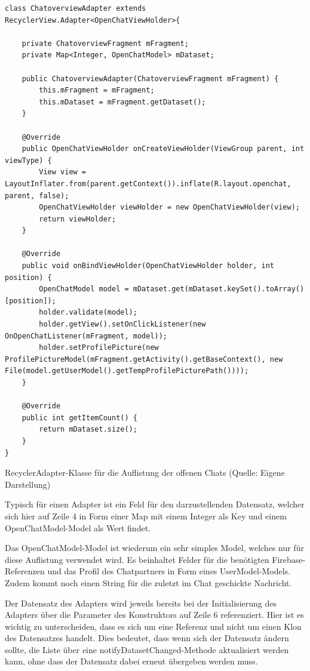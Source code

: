 \documentclass[../main.tex]{subfiles}
\begin{document}
\begin{code}
	\begin{center}
		\begin{verbatim}
class ChatoverviewAdapter extends RecyclerView.Adapter<OpenChatViewHolder>{

	private ChatoverviewFragment mFragment;
	private Map<Integer, OpenChatModel> mDataset;

	public ChatoverviewAdapter(ChatoverviewFragment mFragment) {
		this.mFragment = mFragment;
		this.mDataset = mFragment.getDataset();
	}

	@Override
	public OpenChatViewHolder onCreateViewHolder(ViewGroup parent, int viewType) {
		View view = LayoutInflater.from(parent.getContext()).inflate(R.layout.openchat, parent, false);
		OpenChatViewHolder viewHolder = new OpenChatViewHolder(view);
		return viewHolder;
	}

	@Override
	public void onBindViewHolder(OpenChatViewHolder holder, int position) {
		OpenChatModel model = mDataset.get(mDataset.keySet().toArray()[position]);
		holder.validate(model);
		holder.getView().setOnClickListener(new OnOpenChatListener(mFragment, model));
		holder.setProfilePicture(new ProfilePictureModel(mFragment.getActivity().getBaseContext(), new File(model.getUserModel().getTempProfilePicturePath())));
	}

	@Override
	public int getItemCount() {
		return mDataset.size();
	}
}
		\end{verbatim}
		\caption{RecyclerAdapter-Klasse für die Auflistung der offenen Chats (Quelle: Eigene Darstellung)}
		\label{chatOverviewAdapter}
	\end{center}
\end{code}

	Typisch für einen Adapter ist ein Feld für den darzustellenden Datensatz, welcher sich hier auf Zeile 4 in Form einer Map mit einem Integer als Key und einem OpenChatModel-Model als Wert findet. 
	
	Das OpenChatModel-Model ist wiederum ein sehr simples Model, welches nur für diese Auflistung verwendet wird. Es beinhaltet Felder für die benötigten Firebase-Referenzen und das Profil des Chatpartners in Form eines UserModel-Models. Zudem kommt noch einen String für die zuletzt im Chat geschickte Nachricht.
	
	Der Datensatz des Adapters wird jeweils bereits bei der Initialisierung des Adapters über die Parameter des Konstruktors auf Zeile 6 referenziert. Hier ist es wichtig zu unterscheiden, dass es sich um eine Referenz und nicht um einen Klon des Datensatzes handelt. Dies bedeutet, dass wenn sich der Datensatz ändern sollte, die Liste über eine notifyDatasetChanged-Methode aktualisiert werden kann, ohne dass der Datensatz dabei erneut übergeben werden muss.
	
\end{document}
